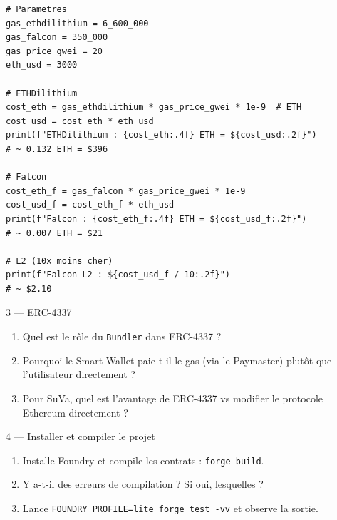 \documentclass[12pt, a4paper]{article}
\begin{document}
\begin{solution}
\begin{lstlisting}[style=python]
# Parametres
gas_ethdilithium = 6_600_000
gas_falcon = 350_000
gas_price_gwei = 20
eth_usd = 3000

# ETHDilithium
cost_eth = gas_ethdilithium * gas_price_gwei * 1e-9  # ETH
cost_usd = cost_eth * eth_usd
print(f"ETHDilithium : {cost_eth:.4f} ETH = ${cost_usd:.2f}")
# ~ 0.132 ETH = $396

# Falcon
cost_eth_f = gas_falcon * gas_price_gwei * 1e-9
cost_usd_f = cost_eth_f * eth_usd
print(f"Falcon : {cost_eth_f:.4f} ETH = ${cost_usd_f:.2f}")
# ~ 0.007 ETH = $21

# L2 (10x moins cher)
print(f"Falcon L2 : ${cost_usd_f / 10:.2f}")
# ~ $2.10
\end{lstlisting}
\end{solution}

\begin{exercice}{3 --- ERC-4337}
\begin{enumerate}[label=\alph*)]
  \item Quel est le rôle du \texttt{Bundler} dans ERC-4337 ?
  \item Pourquoi le Smart Wallet paie-t-il le gas (via le Paymaster)
        plutôt que l'utilisateur directement ?
  \item Pour SuVa, quel est l'avantage de ERC-4337 vs modifier le
        protocole Ethereum directement ?
\end{enumerate}
\end{exercice}

\begin{exercice}{4 --- Installer et compiler le projet}
\begin{enumerate}[label=\alph*)]
  \item Installe Foundry et compile les contrats : \texttt{forge build}.
  \item Y a-t-il des erreurs de compilation ? Si oui, lesquelles ?
  \item Lance \texttt{FOUNDRY\_PROFILE=lite forge test -vv} et observe la sortie.
\end{enumerate}
\end{exercice}
\end{document}
